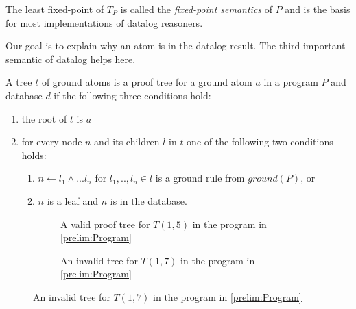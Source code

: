 The least fixed-point of $T_P$ is called the \textit{fixed-point semantics} of $P$ and is the basis for most implementations of datalog reasoners. 

Our goal is to explain why an atom is in the datalog result. The third important semantic of datalog helps here. 

A tree $t$ of ground atoms is a proof tree for a ground atom $a$ in a program $P$ and database $d$ if the following three conditions hold:

\begin{enumerate}
    \item the root of $t$ is $a$
    \item for every node $n$ and its children $l$ in $t$ one of the following two conditions holds: 
    \begin{enumerate}
        \item $n \leftarrow l_1 \land ... l_n$ for $l_1,.., l_n \in l$ is a ground rule from $ground(P)$, or
        \item $n$ is a leaf and $n$ is in the database.
    \end{enumerate}
\end{enumerate}

\begin{figure}[H]
    \centering
    \begin{subfigure}[b]{0.45\linewidth}
    \caption{A valid proof tree for $T(1,5)$ in the program in \cref{prelim:Program}}
    \label{prelim:validTree}
    \end{subfigure}
    \quad
    \begin{subfigure}[b]{0.45\linewidth}
        \caption{An invalid tree for $T(1,7)$ in the program in \cref{prelim:Program}}
        \label{prelim:invalidTree}
    \end{subfigure}
    \end{figure}

